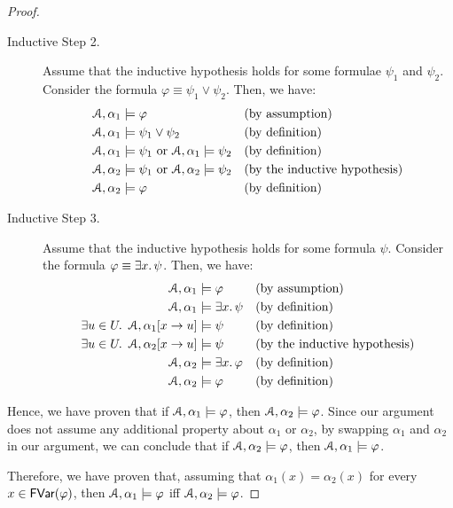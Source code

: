 \documentclass[11pt,usenames, dvipsnames]{article}
\begin{document}
\begin{proof}
\begin{description}
    \item[Inductive Step 2.] Assume that the inductive hypothesis holds for some formulae $\psi_1$ and $\psi_2$. Consider the formula $\varphi \equiv \psi_1 \lor \psi_2$. Then, we have:
    \begin{align*}
      \struct, \alpha_1 &\models \varphi &&\text{(by assumption)}
      \\
      \struct, \alpha_1 &\models \psi_1 \lor \psi_2 &&\text{(by definition)}
      \\
      \struct, \alpha_1 &\models \psi_1 \text{ or } \struct, \alpha_1 \models \psi_2 &&\text{(by definition)}
      \\
      \struct, \alpha_2 &\models \psi_1 \text{ or } \struct, \alpha_2 \models \psi_2 &&\text{(by the inductive hypothesis)}
      \\
      \struct, \alpha_2 &\models \varphi &&\text{(by definition)}
    \end{align*}

    \item[Inductive Step 3.] Assume that the inductive hypothesis holds for some formula $\psi$. Consider the formula $\varphi \equiv \exists x \ldotp \psi$. Then, we have:
    \begin{align*}
      \struct, \alpha_1 &\models \varphi &&\text{(by assumption)}
      \\
      \struct, \alpha_1 &\models \exists x \ldotp \psi &&\text{(by definition)}
      \\
      \exists u \in U \ldotp \ \struct, \alpha_1[x \to u] &\models \psi &&\text{(by definition)}
      \\
      \exists u \in U \ldotp \ \struct, \alpha_2[x \to u] &\models \psi &&\text{(by the inductive hypothesis)}
      \\
      \struct, \alpha_2 &\models \exists x \ldotp \varphi &&\text{(by definition)}
      \\
      \struct, \alpha_2 &\models \varphi &&\text{(by definition)}
    \end{align*}
  \end{description}

  Hence, we have proven that if $\struct, \alpha_1 \models \varphi$, then $\struct, \alpha_2 \models \varphi$. Since our argument does not assume any additional property about $\alpha_1$ or $\alpha_2$, by swapping $\alpha_1$ and $\alpha_2$ in our argument, we can conclude that if $\struct, \alpha_2 \models \varphi$, then $\struct, \alpha_1 \models \varphi$.

  Therefore, we have proven that, assuming that $\alpha_1(x) = \alpha_2(x)$ for every $x \in \mathsf{FVar}(\varphi)$, then $\struct, \alpha_1 \models \varphi$ iff $\struct, \alpha_2 \models \varphi$.
\end{proof}
\end{document}
